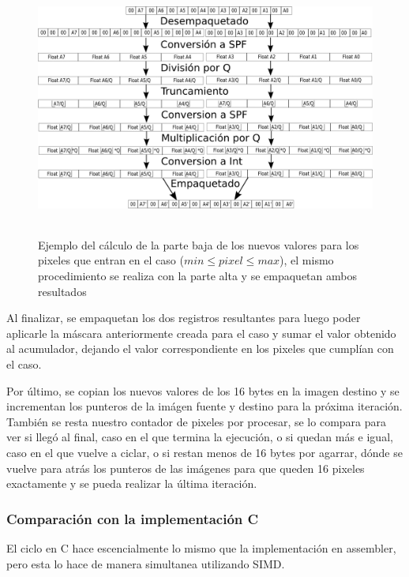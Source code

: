 \begin{figure}[H]
\centering
\includegraphics[width=150mm, height=85mm]{calcq.png}
\caption{Ejemplo del cálculo de la parte baja de los nuevos valores para los pixeles que entran en el caso ($min \leq pixel \leq max$), el mismo procedimiento se realiza con la parte alta y se empaquetan ambos resultados}
\label{overflow}
\end{figure}

Al finalizar, se empaquetan los dos registros resultantes para luego poder aplicarle la máscara anteriormente creada para el caso y sumar el valor obtenido al acumulador, dejando el valor correspondiente en los pixeles que cumplían con el caso.

Por último, se copian los nuevos valores de los 16 bytes en la imagen destino y se incrementan los punteros de la imágen fuente y destino para la próxima iteración. También se resta nuestro contador de pixeles por procesar, se lo compara para ver si llegó al final, caso en el que termina la ejecución, o si quedan más e igual, caso en el que vuelve a ciclar, o si restan menos de 16 bytes por agarrar, dónde se vuelve para atrás los punteros de las imágenes para que queden 16 pixeles exactamente y se pueda realizar la última iteración.

\subsubsection{Comparación con la implementación C}
El ciclo en C hace escencialmente lo mismo que la implementación en assembler, pero esta lo hace de manera simultanea utilizando SIMD. 

